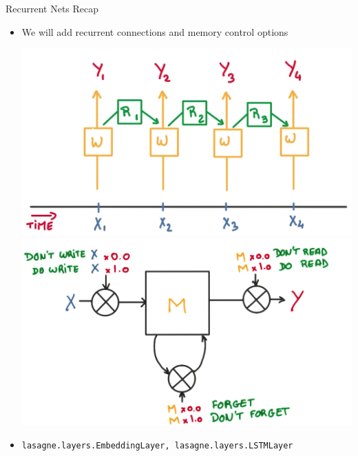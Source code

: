 \documentclass{beamer}
\begin{document}
\begin{frame}{Recurrent Nets Recap}
\begin{itemize}
		\item We will add recurrent connections and memory control options
		\begin{center}
			\includegraphics[scale=0.13]{img/rec2}
			\includegraphics[scale=0.1]{img/lstm}
		\end{center}
	\item \texttt{lasagne.layers.EmbeddingLayer, lasagne.layers.LSTMLayer}
	\end{itemize}
\end{frame}
\end{document}
